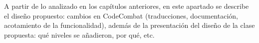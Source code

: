 A partir de lo analizado en los capítulos anteriores, en este apartado se describe el diseño propuesto: cambios en CodeCombat (traducciones, documentación, acotamiento de la funcionalidad), además de la presentación del diseño de la clase propuesta: qué niveles se añadieron, por qué, etc.